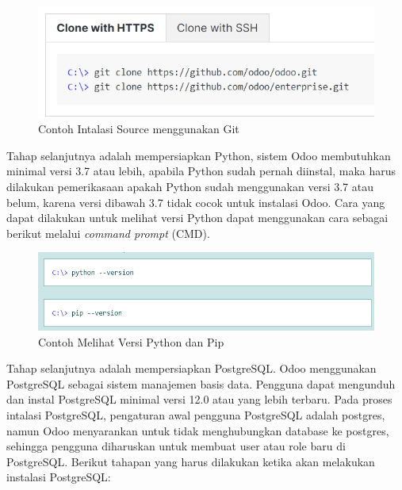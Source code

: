 \begin{figure}[H]
	\centering
	\includegraphics[scale=0.7]{Gambar/clone.png}
	\caption{Contoh Intalasi Source menggunakan Git} 
	\label{fig:clonegit}
\end{figure}

Tahap selanjutnya adalah mempersiapkan Python, sistem Odoo membutuhkan minimal versi 3.7 atau lebih, apabila Python sudah pernah diinstal, maka harus dilakukan pemerikasaan apakah Python sudah menggunakan versi 3.7 atau belum, karena versi dibawah 3.7 tidak cocok untuk instalasi Odoo. Cara yang dapat dilakukan untuk melihat versi Python dapat menggunakan cara sebagai berikut melalui \textit{command prompt} (CMD).

\begin{figure}[H]
	\centering
	\includegraphics[scale=0.7]{Gambar/python.png}
	\caption{Contoh Melihat Versi Python dan Pip} 
	\label{fig:pip}
\end{figure}

Tahap selanjutnya adalah mempersiapkan PostgreSQL. Odoo menggunakan PostgreSQL sebagai sistem manajemen basis data. Pengguna dapat mengunduh dan instal PostgreSQL minimal versi 12.0 atau yang lebih terbaru. Pada proses intalasi PostgreSQL, pengaturan awal pengguna PostgreSQL adalah postgres, namun Odoo menyarankan untuk tidak menghubungkan database ke postgres, sehingga pengguna diharuskan untuk membuat user atau role baru di PostgreSQL. Berikut tahapan yang harus dilakukan ketika akan melakukan instalasi PostgreSQL:

